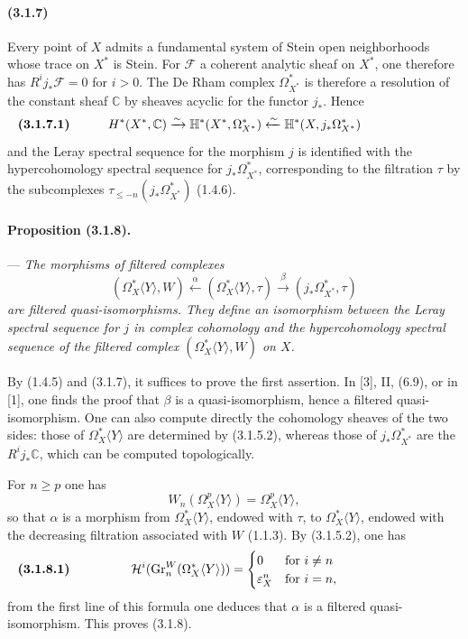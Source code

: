 \documentclass[10pt]{article}
\newcommand{\C}{\mathbb C}
\newcommand{\Gr}{\operatorname{Gr}}
\begin{document}
\paragraph{(3.1.7)} Every point of $X$ admits a fundamental system of Stein open neighborhoods whose trace on $X^*$ is Stein. For $\mathcal F$ a coherent analytic sheaf on $X^*$, one therefore has $R^ij_*\mathcal F=0$ for $i>0$. The De Rham complex $\Omega_{X^*}^*$ is therefore a resolution of the constant sheaf $\C$ by sheaves acyclic for the functor $j_*$. Hence
\[
\makebox[\textwidth][s]{\textbf{(3.1.7.1)}\hfill$\displaystyle H^*(X^*,\C)\xrightarrow{\sim}\mathbb H^*(X^*,\Omega_{X^*}^*)\xleftarrow{\sim}\mathbb H^*(X,j_*\Omega_{X^*}^*)$\hfill\phantom{\textbf{(3.1.7.1)}}}
\]
and the Leray spectral sequence for the morphism $j$ is identified with the hypercohomology spectral sequence for $j_*\Omega_{X^*}^*$, corresponding to the filtration $\tau$ by the subcomplexes $\tau_{\le -n}(j_*\Omega_{X^*}^*)$ (1.4.6).

\paragraph{Proposition (3.1.8).} --- {\itshape The morphisms of filtered complexes
\[
(\Omega_X^*\langle Y\rangle,W)
\xleftarrow{\ \alpha\ }
(\Omega_X^*\langle Y\rangle,\tau)
\xrightarrow{\ \beta\ }
(j_*\Omega_{X^*}^*,\tau)
\]
are filtered quasi-isomorphisms. They define an isomorphism between the Leray spectral sequence for $j$ in complex cohomology and the hypercohomology spectral sequence of the filtered complex $(\Omega_X^*\langle Y\rangle,W)$ on $X$.}

By (1.4.5) and (3.1.7), it suffices to prove the first assertion. In [3], II, (6.9), or in [1], one finds the proof that $\beta$ is a quasi-isomorphism, hence a filtered quasi-isomorphism. One can also compute directly the cohomology sheaves of the two sides: those of $\Omega_X^*\langle Y\rangle$ are determined by (3.1.5.2), whereas those of $j_*\Omega_{X^*}^*$ are the $R^ij_*\C$, which can be computed topologically.

For $n\ge p$ one has
\[
W_n(\Omega_X^p\langle Y\rangle)=\Omega_X^p\langle Y\rangle,
\]
so that $\alpha$ is a morphism from $\Omega_X^*\langle Y\rangle$, endowed with $\tau$, to $\Omega_X^*\langle Y\rangle$, endowed with the decreasing filtration associated with $W$ (1.1.3). By (3.1.5.2), one has
\[
\makebox[\textwidth][s]{\textbf{(3.1.8.1)}\hfill$\displaystyle \mathcal H^i(\Gr_n^W(\Omega_X^*\langle Y\rangle))=\begin{cases}0&\text{for }i\ne n\\ \varepsilon_X^n&\text{for }i=n,\end{cases}$\hfill\phantom{\textbf{(3.1.8.1)}}}
\]
from the first line of this formula one deduces that $\alpha$ is a filtered quasi-isomorphism. This proves (3.1.8).
\end{document}
